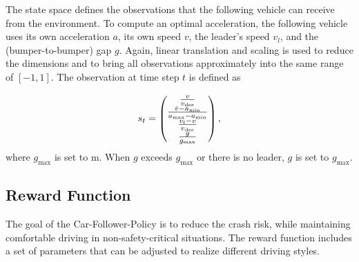 \documentclass[review]{elsarticle}
\providecommand{\sub}[1]{_{\mathrm{#1}}}  %
\providecommand{\3}{{\ss}}
\begin{document}
The state space defines the observations that the following
vehicle can receive from the environment. To compute an optimal
acceleration, the following vehicle uses its own acceleration $a$,
its own speed $v$, the leader's speed $v_l$,
and the (bumper-to-bumper) gap $g$.
 Again, linear translation and scaling is used
to reduce the dimensions and to bring all observations approximately
into the same range of $[-1,1]$. The observation at time step $t$ is defined as

\begin{equation}
s_t = 
\begin{pmatrix} 
\frac{v}{v\sub{des}} \\ 
\frac{\dot{v}-a\sub{\rm min}}{a\sub{\rm max} - a\sub{\rm min}}\\
\frac{v_l-v}{v\sub{des}}\\
\frac{g}{g\sub{\rm max}}

\end{pmatrix},
\end{equation}
%
where $g\sub{max}$ is set to  \unit[200]{m}. When $g$ exceeds  $g\sub{max}$ or there is no leader, $g$ is set to  $g\sub{max}$.

\subsection{Reward Function}
\label{rewardFunction}
The goal of the Car-Follower-Policy is to reduce the crash risk, while
maintaining comfortable driving in non-safety-critical situations. The
reward function includes a set of parameters that can be
adjusted to realize different driving styles. 
\end{document}
